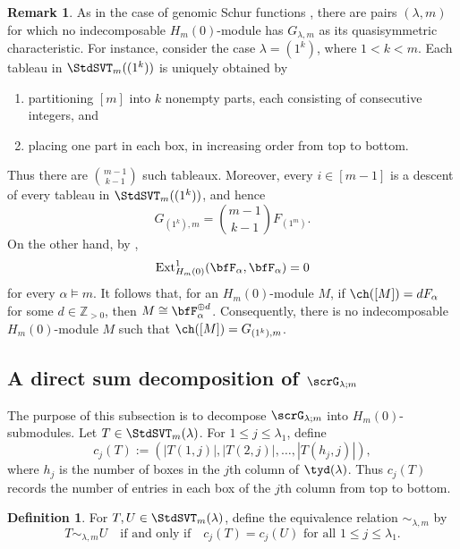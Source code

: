 \documentclass[12pt, reqno]{amsart}
\numberwithin{equation}{section}
\numberwithin{figure}{section}
\numberwithin{table}{section}
\theoremstyle{definition}
\newtheorem{definition}[theorem]{Definition}
\newtheorem{remark}[theorem]{Remark}
\def\Z{\mathbb Z}
\begin{document}
\begin{remark}\label{rem: indecomposable module}
As in the case of genomic Schur functions \cite[Remark~3.7]{KY24}, there are pairs $(\lambda,m)$ for which no indecomposable $H_m(0)$-module has $G_{\lambda,m}$ as its quasisymmetric characteristic.
For instance, consider the case $\lambda=(1^k)$, where $1 < k < m$.
Each tableau in $\StdSVT_m((1^k))$ is uniquely obtained by 
\begin{enumerate}[label = {\rm (\roman*)}, leftmargin = 4ex]
\item 
partitioning $[m]$ into $k$ nonempty parts, each consisting of consecutive integers, and 
\item 
placing one part in each box, in increasing order from top to bottom.
\end{enumerate}
Thus there are $\binom{m-1}{k-1}$ such tableaux.
Moreover, every $i \in [m-1]$ is a descent of every tableau in $\StdSVT_m((1^k))$, and hence
\[
G_{(1^k),m}=\binom{m-1}{k-1}F_{(1^m)}.
\]
On the other hand, by \cite[Theorem~4.7]{DHT02},
\[
\operatorname{Ext}^1_{H_m(0)}(\bfF_\alpha,\bfF_\alpha)=0
\]
for every $\alpha\models m$.
It follows that, for an $H_m(0)$-module $M$, if $\ch([M])=dF_\alpha$ for some $d \in \Z_{>0}$, then $M \cong \bfF_\alpha^{\oplus d}$.
Consequently, there is no indecomposable $H_m(0)$-module $M$ such that $\ch([M]) = G_{(1^k),m}$.
\end{remark}



\subsection[A direct sum decomposition]{A direct sum decomposition of $\scrG_{\lambda;m}$}
\label{subsec: decomposition}

The purpose of this subsection is to decompose $\scrG_{\lambda;m}$ into $H_m(0)$-submodules.
Let $T \in \StdSVT_m(\lambda)$.
For $1 \le j \le \lambda_1$, define
\[
c_j(T) := \left( |T(1,j)|,|T(2,j)|,\ldots,|T(h_j,j)| \right),
\]
where $h_j$ is the number of boxes in the $j$th column of $\tyd(\lambda)$.
Thus $c_j(T)$ records the number of entries in each box of the $j$th column from top to bottom.


\begin{definition}\label{def: column equivalence}
For $T,U \in \StdSVT_m(\lambda)$, define the equivalence relation $\sim_{\lambda,m}$ by
\[
T\sim_{\lambda,m}U
\quad\text{if and only if}\quad
c_j(T)=c_j(U)\text{ for all }1 \le j \le \lambda_1.
\]
\end{definition}
\end{document}
